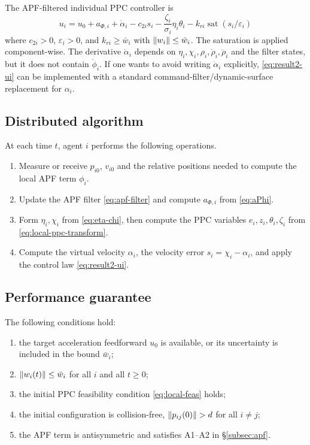 The APF-filtered individual PPC controller is
\begin{equation}
\boxed{
u_i=u_0+a_{\Phi,i}+\dot\alpha_i
-c_{2i}s_i
-\frac{\zeta_i}{\sigma_i}\eta_i\theta_i
-k_{ri}\operatorname{sat}(s_i/\varepsilon_i)
}
\label{eq:result2-ui}
\end{equation}
where $c_{2i}>0$, $\varepsilon_i>0$, and
$k_{ri}\ge\bar w_i$ with $\lVert w_i \rVert\le\bar w_i$.  The saturation is applied
component-wise.  The derivative $\dot\alpha_i$ depends on
$\eta_i,\chi_i,\rho_i,\dot\rho_i,\ddot\rho_i$ and the filter states, but it
does not contain $\dot\phi_i$.  If one wants to avoid writing
$\dot\alpha_i$ explicitly, \eqref{eq:result2-ui} can be implemented with a
standard command-filter/dynamic-surface replacement for $\alpha_i$.

\subsection{Distributed algorithm}

At each time $t$, agent $i$ performs the following operations.
\begin{enumerate}
    \item Measure or receive $p_{i0}$, $v_{i0}$ and the relative positions
    needed to compute the local APF term $\phi_i$.

    \item Update the APF filter \eqref{eq:apf-filter} and compute
    $a_{\Phi,i}$ from \eqref{eq:aPhi}.

    \item Form $\eta_i,\chi_i$ from \eqref{eq:eta-chi}, then compute the
    PPC variables $e_i,z_i,\theta_i,\zeta_i$ from
    \eqref{eq:local-ppc-transform}.

    \item Compute the virtual velocity $\alpha_i$, the velocity error
    $s_i=\chi_i-\alpha_i$, and apply the control law
    \eqref{eq:result2-ui}.
\end{enumerate}

\subsection{Performance guarantee}

\begin{assumption}
\label{as:result2}
The following conditions hold:
\begin{enumerate}
    \item the target acceleration feedforward $u_0$ is available, or its
    uncertainty is included in the bound $\bar w_i$;
    \item $\lVert w_i(t) \rVert\le\bar w_i$ for all $i$ and all $t\ge0$;
    \item the initial PPC feasibility condition \eqref{eq:local-feas} holds;
    \item the initial configuration is collision-free,
    $\lVert p_{ij}(0) \rVert>d$ for all $i\neq j$;
    \item the APF term is antisymmetric and satisfies A1--A2 in
    \S\ref{subsec:apf}.
\end{enumerate}
\end{assumption}

